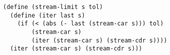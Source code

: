 \documentclass[a4paper,12pt]{article}
\begin{document}
\begin{lstlisting}
(define (stream-limit s tol)
  (define (iter last s)
    (if (< (abs (- last (stream-car s))) tol)
        (stream-car s)
        (iter (stream-car s) (stream-cdr s))))
  (iter (stream-car s) (stream-cdr s)))
\end{lstlisting}
\end{document}

